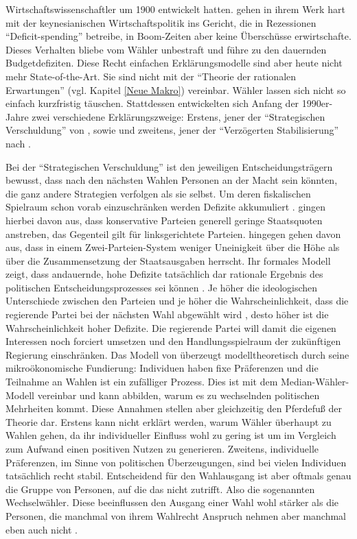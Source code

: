 Wirtschaftswissenschaftler um 1900 entwickelt hatten. \textcite{Buchanan1977} gehen in ihrem Werk hart mit der keynesianischen Wirtschaftspolitik ins Gericht, die in Rezessionen "`Deficit-spending"' betreibe, in Boom-Zeiten aber keine Überschüsse erwirtschafte. Dieses Verhalten bliebe vom Wähler unbestraft und führe zu den dauernden Budgetdefiziten. Diese Recht einfachen Erklärungsmodelle sind aber heute nicht mehr State-of-the-Art. Sie sind nicht mit der "`Theorie der rationalen Erwartungen"' (vgl. Kapitel \ref{Neue Makro}) vereinbar. Wähler lassen sich nicht so einfach kurzfristig täuschen. Stattdessen entwickelten sich Anfang der 1990er-Jahre zwei verschiedene Erklärungszweige: Erstens, jener der "`Strategischen Verschuldung"' von \textcite{Persson1989}, sowie \textcite{Alesina1990} und zweitens, jener der "`Verzögerten Stabilisierung"' nach \textcite{Alesina1991}. 

Bei der "`Strategischen Verschuldung"' ist den jeweiligen Entscheidungsträgern bewusst, dass nach den nächsten Wahlen Personen an der Macht sein könnten, die ganz andere Strategien verfolgen als sie selbst. Um deren fiskalischen Spielraum schon vorab einzuschränken werden Defizite akkumuliert \parencite[S. 681]{Romer2019}. \textcite{Persson1989} gingen hierbei davon aus, dass konservative Parteien generell geringe Staatsquoten anstreben, das Gegenteil gilt für linksgerichtete Parteien. \textcite{Alesina1990} hingegen gehen davon aus, dass in einem Zwei-Parteien-System weniger Uneinigkeit über die Höhe als über die Zusammensetzung der Staatsausgaben herrscht. Ihr formales Modell zeigt, dass andauernde, hohe Defizite tatsächlich dar rationale Ergebnis des politischen Entscheidungsprozesses sei können \parencite[S. 403]{Alesina1990}. Je höher die ideologischen Unterschiede zwischen den Parteien \parencite[S. 413]{Alesina1990} und je höher die Wahrscheinlichkeit, dass die regierende Partei bei der nächsten Wahl abgewählt wird \parencite[S. 410]{Alesina1990}, desto höher ist die Wahrscheinlichkeit hoher Defizite. Die regierende Partei will damit die eigenen Interessen noch forciert umsetzen und den Handlungsspielraum der zukünftigen Regierung einschränken. Das Modell von \textcite{Alesina1990} überzeugt modelltheoretisch durch seine mikroökonomische Fundierung: Individuen haben fixe Präferenzen und die Teilnahme an Wahlen ist ein zufälliger Prozess. Dies ist mit dem Median-Wähler-Modell vereinbar und kann abbilden, warum es zu wechselnden politischen Mehrheiten kommt. Diese Annahmen stellen aber gleichzeitig den Pferdefuß der Theorie dar. Erstens kann nicht erklärt werden, warum Wähler überhaupt zu Wahlen gehen, da ihr individueller Einfluss wohl zu gering ist um im Vergleich zum Aufwand einen positiven Nutzen zu generieren. Zweitens, individuelle Präferenzen, im Sinne von politischen Überzeugungen, sind bei vielen Individuen tatsächlich recht stabil. Entscheidend für den Wahlausgang ist aber oftmals genau die Gruppe von Personen, auf die das nicht zutrifft. Also die sogenannten Wechselwähler. Diese beeinflussen den Ausgang einer Wahl wohl stärker als die Personen, die manchmal von ihrem Wahlrecht Anspruch nehmen aber manchmal eben auch nicht \parencite[S. 687]{Romer2019}. 

